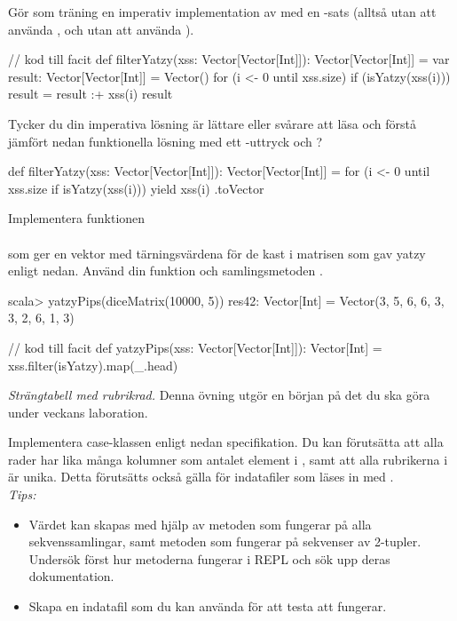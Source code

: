 \Subtask Gör som träning en imperativ implementation av  med en -sats (alltså utan att använda , och utan att använda ). 
\begin{CodeSmall}
// kod till facit
def filterYatzy(xss: Vector[Vector[Int]]): Vector[Vector[Int]] = {
  var result: Vector[Vector[Int]] = Vector()
  for (i <- 0 until xss.size) {
    if (isYatzy(xss(i))) result = result :+ xss(i) 
  } 
  result
}
\end{CodeSmall}

\Subtask\Pen Tycker du din imperativa lösning är lättare eller svårare att läsa och förstå jämfört nedan funktionella lösning med ett -uttryck och ?
\begin{CodeSmall}
def filterYatzy(xss: Vector[Vector[Int]]): Vector[Vector[Int]] = {
  for (i <- 0 until xss.size if isYatzy(xss(i))) yield xss(i)
}.toVector  
\end{CodeSmall}

\Subtask Implementera funktionen \\ 
 \\ som ger en vektor med tärningsvärdena för de kast i matrisen  som gav yatzy enligt nedan. Använd din funktion  och samlingsmetoden . 
\begin{REPL}
scala> yatzyPips(diceMatrix(10000, 5))
res42: Vector[Int] = Vector(3, 5, 6, 6, 3, 3, 2, 6, 1, 3)
\end{REPL}

\begin{Code}
// kod till facit
def yatzyPips(xss: Vector[Vector[Int]]): Vector[Int] = 
  xss.filter(isYatzy).map(_.head)
\end{Code}



\Task \emph{Strängtabell med rubrikrad.} Denna övning utgör en början på det du ska göra under veckans laboration.

\Subtask Implementera case-klassen  enligt nedan specifikation. Du kan förutsätta att alla rader har lika många kolumner som antalet element i , samt att alla rubrikerna i  är unika. Detta förutsätts också gälla för indatafiler som läses in med . 
\\ \noindent \emph{Tips:} 
\begin{itemize}[nolistsep,noitemsep]
\item Värdet  kan skapas med hjälp av metoden  som fungerar på alla sekvenssamlingar, samt metoden  som fungerar på sekvenser av 2-tupler. Undersök först hur metoderna fungerar i REPL och sök upp deras dokumentation.
\item Skapa en indatafil som du kan använda för att testa att  fungerar. 
\end{itemize}

